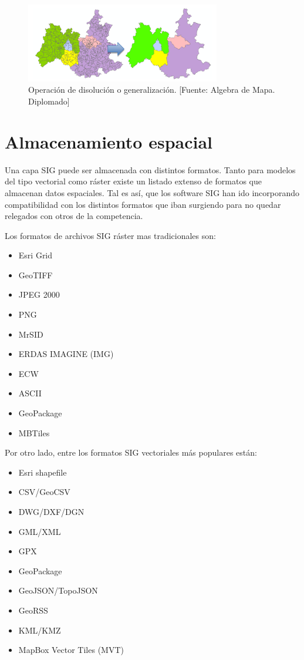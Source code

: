 \begin{figure}[H]
    \centering
    \includegraphics[width=8.5cm]{disolucion_vectorial.png}
    \caption{Operación de disolución o generalización. [Fuente: Algebra de Mapa. Diplomado]}
    \label{fig:disolution}
\end{figure}

\section{Almacenamiento espacial}

Una capa SIG puede ser almacenada con distintos formatos. Tanto para modelos del tipo vectorial como ráster existe un listado extenso de formatos que almacenan datos espaciales. Tal es así, que los software SIG han ido incorporando compatibilidad con los distintos formatos que iban surgiendo para no quedar relegados con otros de la competencia.

Los formatos de archivos SIG ráster mas tradicionales son: 
\begin{itemize}
    \item Esri Grid
    \item GeoTIFF
    \item JPEG 2000
    \item PNG
    \item MrSID
    \item ERDAS IMAGINE (IMG)
    \item ECW
    \item ASCII
    \item GeoPackage
    \item MBTiles
\end{itemize}

Por otro lado, entre los formatos SIG vectoriales más populares están: 
\begin{itemize}
    \item Esri shapefile
    \item CSV/GeoCSV
    \item DWG/DXF/DGN
    \item GML/XML
    \item GPX
    \item GeoPackage
    \item GeoJSON/TopoJSON
    \item GeoRSS
    \item KML/KMZ
    \item MapBox Vector Tiles (MVT)
\end{itemize}

